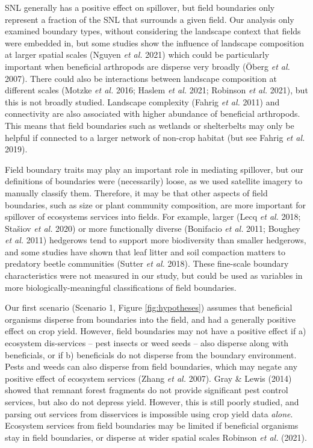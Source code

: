 \documentclass[]{elsarticle} %
\begin{document}
SNL generally has a positive effect on spillover, but field boundaries only represent a fraction of the SNL that surrounds a given field.
Our analysis only examined boundary types, without considering the landscape context that fields were embedded in, but some studies show the influence of landscape composition at larger spatial scales (Nguyen \emph{et al.} 2021) which could be particularly important when beneficial arthropods are disperse very broadly (Öberg \emph{et al.} 2007).
There could also be interactions between landscape composition at different scales (Motzke \emph{et al.} 2016; Haslem \emph{et al.} 2021; Robinson \emph{et al.} 2021), but this is not broadly studied.
Landscape complexity (Fahrig \emph{et al.} 2011) and connectivity are also associated with higher abundance of beneficial arthropods.
This means that field boundaries such as wetlands or shelterbelts may only be helpful if connected to a larger network of non-crop habitat (but see Fahrig \emph{et al.} 2019).

Field boundary traits may play an important role in mediating spillover, but our definitions of boundaries were (necessarily) loose, as we used satellite imagery to manually classify them.
Therefore, it may be that other aspects of field boundaries, such as size or plant community composition, are more important for spillover of ecosystems services into fields.
For example, larger (Lecq \emph{et al.} 2018; Stašiov \emph{et al.} 2020) or more functionally diverse (Bonifacio \emph{et al.} 2011; Boughey \emph{et al.} 2011) hedgerows tend to support more biodiversity than smaller hedgerows, and some studies have shown that leaf litter and soil compaction matters to predatory beetle communities (Sutter \emph{et al.} 2018).
These fine-scale boundary characteristics were not measured in our study, but could be used as variables in more biologically-meaningful classifications of field boundaries.

Our first scenario (Scenario 1, Figure \ref{fig:hypotheses}) assumes that beneficial organisms disperse from boundaries into the field, and had a generally positive effect on crop yield.
However, field boundaries may not have a positive effect if a) ecosystem dis-services -- pest insects or weed seeds -- also disperse along with beneficials, or if b) beneficials do not disperse from the boundary environment.
Pests and weeds can also disperse from field boundaries, which may negate any positive effect of ecosystem services (Zhang \emph{et al.} 2007).
Gray \& Lewis (2014) showed that remnant forest fragments do not provide significant pest control services, but also do not depress yield.
However, this is still poorly studied, and parsing out services from disservices is impossible using crop yield data \emph{alone}.
Ecosystem services from field boundaries may be limited if beneficial organisms stay in field boundaries, or disperse at wider spatial scales Robinson \emph{et al.} (2021).
\end{document}

